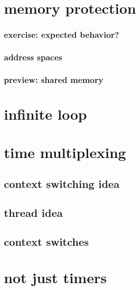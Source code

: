 \section{memory protection}

\subsubsection{exercise: expected behavior?}


\subsubsection{address spaces}


\subsubsection{preview: shared memory}


\section{infinite loop}



\section{time multiplexing}


\subsection{context switching idea}


\subsection{thread idea}


\subsection{context switches} 


\section{not just timers}


